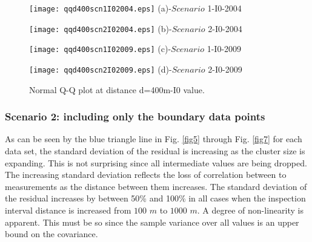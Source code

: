 \documentclass[Journal]{ascelike}
\begin{document}
\begin{figure}
     \begin{minipage}[h]{0.5\linewidth}
        \centering
        \texttt{[image: qqd400scn1I02004.eps]}
				\footnotesize{(a)-$Scenario$ 1-I0-2004}
     \end{minipage}
\vspace{5.00mm}
    \begin{minipage}[h]{0.5\linewidth}
       \centering
       \texttt{[image: qqd400scn2I02004.eps]}
			\footnotesize{(b)-$Scenario$ 2-I0-2004}
     \end{minipage}
\vspace{5.00mm}
    \begin{minipage}[h]{0.5\linewidth}
       \centering
       \texttt{[image: qqd400scn1I02009.eps]}
			\footnotesize{(c)-$Scenario$ 1-I0-2009}
     \end{minipage}
\vspace{3.00mm}
    \begin{minipage}[h]{0.5\linewidth}
       \centering
       \texttt{[image: qqd400scn2I02009.eps]}
			\footnotesize{(d)-$Scenario$ 2-I0-2009}
     \end{minipage}
		\caption{Normal Q-Q plot at distance d=400m-I0 value.}
\label{fig8}
\end{figure}

%
%

%
%
\subsubsection{Scenario 2: including only the boundary data points} \label{casestudy42}
As can be seen by the blue triangle line in Fig. \ref{fig5} through Fig. \ref{fig7} for each data set, the standard deviation of the residual is 
increasing as the cluster size is expanding. This is not surprising since all intermediate values are being dropped. The increasing standard deviation reflects the loss of correlation between to measurements as the distance between them increases. The standard deviation of the residual increases by between 50\% and 100\% in all cases when the inspection interval distance is increased from $100$ $m$ to $1000$ $m$. A degree of non-linearity is apparent. This must be so since the sample variance over all values is an upper bound on the covariance.
\end{document}
